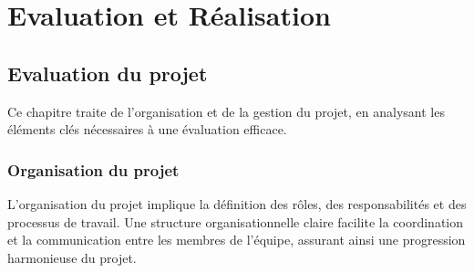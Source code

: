 \part{Evaluation et Réalisation}
\label{part:evaluation-et-realisation}
\chapter{Evaluation du projet}
Ce chapitre traite de l’organisation et de la gestion du projet, en analysant
les éléments clés nécessaires à une évaluation efficace.

\section{Organisation du projet}
L’organisation du projet implique la définition des rôles, des responsabilités
et des processus de travail. Une structure organisationnelle claire facilite
la coordination et la communication entre les membres de l’équipe, assurant
ainsi une progression harmonieuse du projet.

%

